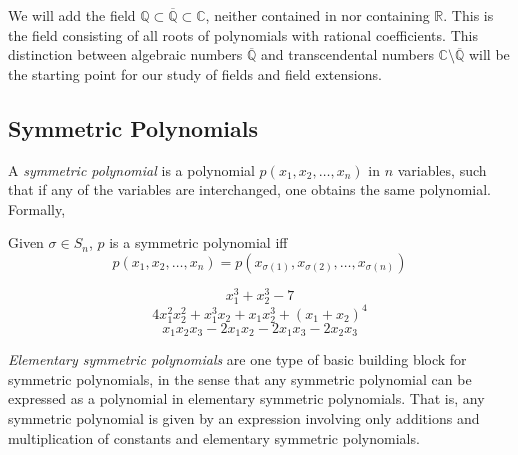 We will add the field \(\mathbb{Q} \subset \overline{\mathbb{Q}} \subset \mathbb{C}\), neither contained in nor containing \(\mathbb{R}\).
This is the field consisting of all roots of polynomials with rational coefficients.
This distinction between algebraic numbers \(\overline{\mathbb{Q}}\) and transcendental numbers \(\mathbb{C} \setminus \overline{\mathbb{Q}}\) will be the starting point for our study of fields and field extensions.

\subsection{Symmetric Polynomials}
A \emph{symmetric polynomial} is a polynomial \(p(x_1, x_2, \ldots, x_n)\) in \(n\) variables, such that if any of the variables are interchanged, one obtains the same polynomial.
Formally,
\begin{definition}
   Given \(\sigma \in S_n\), \(p\) is a symmetric polynomial iff
   \[p(x_1, x_2, \ldots, x_n) = p(x_{\sigma(1)}, x_{\sigma(2)}, \ldots, x_{\sigma(n)})\]
\end{definition}
\begin{example}
   \[x_1^3 + x_2^3-7\]
   \[4x_1^2x_2^2 + x_1^3x_2 + x_1x_2^3 + (x_1 + x_2)^4\]
   \[x_1x_2x_3 - 2x_1x_2 - 2x_1x_3 - 2x_2x_3\]
\end{example}
\emph{Elementary symmetric polynomials} are one type of basic building block for symmetric polynomials, in the sense that any symmetric polynomial can be expressed as a polynomial in elementary symmetric polynomials.
That is, any symmetric polynomial is given by an expression involving only additions and multiplication of constants and elementary symmetric polynomials.

